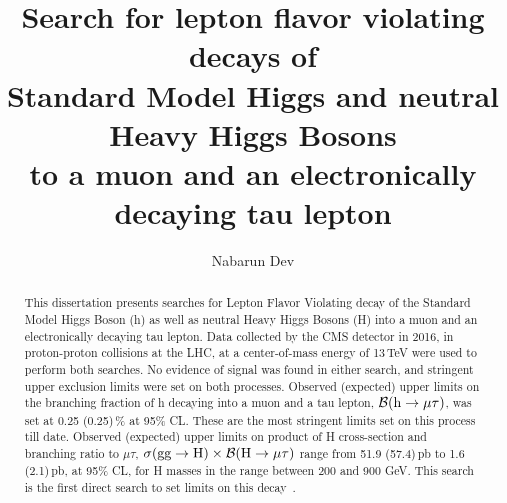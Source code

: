 \documentclass[final,numrefs,sort&compress]{nddiss2e}
\begin{document}
\newlength\cmsTabSkip
\setlength\cmsTabSkip{2ex}


\frontmatter %

\title{Search for lepton flavor violating decays of \protect\\ Standard Model Higgs and neutral Heavy Higgs Bosons \protect\\to a muon and an electronically decaying tau lepton}
\author{Nabarun Dev}

\maketitle
%
%

{} %
\makecopyright

\begin{abstract}
This dissertation presents searches for Lepton Flavor Violating decay of the Standard Model Higgs Boson (h) as well as neutral Heavy Higgs Bosons (H) into a muon and an electronically decaying tau lepton. Data collected by the CMS detector in 2016, in proton-proton collisions at the LHC, at a center-of-mass energy of 13\,TeV were used to perform both searches. No evidence of signal was found in either search, and stringent upper exclusion limits were set on both processes. Observed (expected) upper limits on the branching fraction of h decaying into a muon and a tau lepton, $\mathcal{B}(\text{h} \to \mu \tau)$, was set at 0.25 (0.25)\,\% at 95\% CL. These are the most stringent limits set on this process till date. Observed (expected) upper limits on product of H cross-section and branching ratio to $\mu\tau$, $\sigma(\textrm{gg}\rightarrow \text{H})\times\mathcal{B}(\text{H} \to \mu \tau)$ range from 51.9 (57.4)\,pb to 1.6 (2.1)\,pb, at 95\% CL, for H masses in the range between 200 and 900 GeV. This search is the first direct search to set limits on this decay~\cite{HIG-17-001,HIG-18-017}.
  
\end{abstract}
\end{document}
